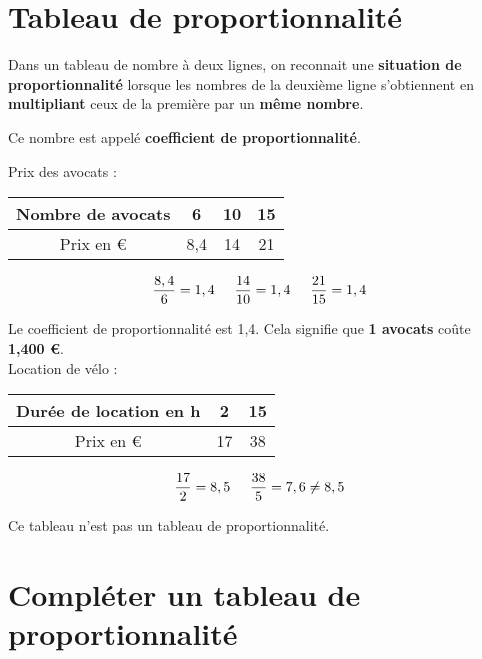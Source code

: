 \begin{pageCours}
\section{Tableau de proportionnalité}

\begin{Def}
Dans un tableau de nombre à deux lignes, on reconnait une \textbf{situation de proportionnalité} lorsque les nombres de la deuxième ligne s'obtiennent en \textbf{multipliant} ceux de la première par un \textbf{même nombre}.

Ce nombre est appelé \textbf{coefficient de proportionnalité}.
\end{Def}

\begin{Ex}
Prix des avocats :
\begin{center}
    \begin{tabular}{c||c|c|c}
        Nombre de avocats & 6 & 10 & 15  \\
        \hline Prix en \euro & 8,4 & 14 & 21 \\
    \end{tabular}
\end{center}
    
\[\frac{8,4}{6}=1,4\hspace{.5cm}\frac{14}{10}=1,4\hspace{.5cm}\frac{21}{15}=1,4\]

Le coefficient de proportionnalité est 1,4. Cela signifie que \textbf{1 avocats} coûte \textbf{1,400 \euro}.\\

Location de vélo :
\begin{center}
    \begin{tabular}{c||c|c}
        Durée de location en h & 2 & 15  \\
        \hline Prix en \euro & 17 & 38 \\ 
    \end{tabular}
\end{center}
    
\[\frac{17}{2}=8,5\hspace{.5cm}\frac{38}{5}=7,6\neq8,5\]

Ce tableau n'est pas un tableau de proportionnalité.
\end{Ex}

\section{Compléter un tableau de proportionnalité}


\end{pageCours}
